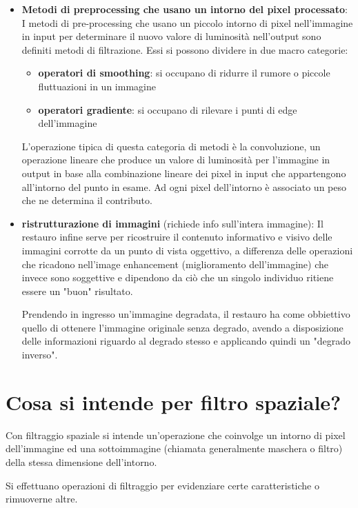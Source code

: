 \begin{itemize}
	\item \textbf{Metodi di preprocessing che usano un intorno del pixel processato}: I metodi di pre-processing che usano un piccolo intorno di pixel nell'immagine in input per determinare il nuovo valore di luminosità nell'output sono definiti metodi di filtrazione. Essi si possono dividere in due macro categorie:
	\begin{itemize}
		\item \textbf{operatori di smoothing}: si occupano di ridurre il rumore o piccole fluttuazioni in un immagine
		
		\item \textbf{operatori gradiente}: si occupano di rilevare i punti di edge dell'immagine
	\end{itemize}
	
	L'operazione tipica di questa categoria di metodi è la convoluzione, un operazione lineare che produce un valore di luminosità per l'immagine in output in base alla combinazione lineare dei pixel in input che appartengono all'intorno del punto in esame. Ad ogni pixel dell'intorno è associato un peso che ne determina il contributo.
	
	\item \textbf{ristrutturazione di immagini} (richiede info sull'intera immagine): Il restauro infine serve per ricostruire il contenuto informativo e visivo delle immagini corrotte da un punto di vista	oggettivo, a differenza delle operazioni che ricadono nell'image enhancement (miglioramento dell'immagine) che invece sono soggettive e dipendono da ciò che un singolo individuo ritiene essere un "buon" risultato.
	
	Prendendo in ingresso un'immagine degradata, il restauro ha come obbiettivo quello di ottenere l'immagine originale senza degrado, avendo a disposizione delle informazioni riguardo al degrado stesso e applicando quindi un "degrado inverso".
\end{itemize}

\section{Cosa si intende per filtro spaziale?}
Con filtraggio spaziale si intende un'operazione che coinvolge un intorno di pixel dell'immagine ed una sottoimmagine (chiamata generalmente maschera o filtro) della stessa dimensione dell'intorno.

Si effettuano operazioni di filtraggio per evidenziare certe caratteristiche o rimuoverne altre.


